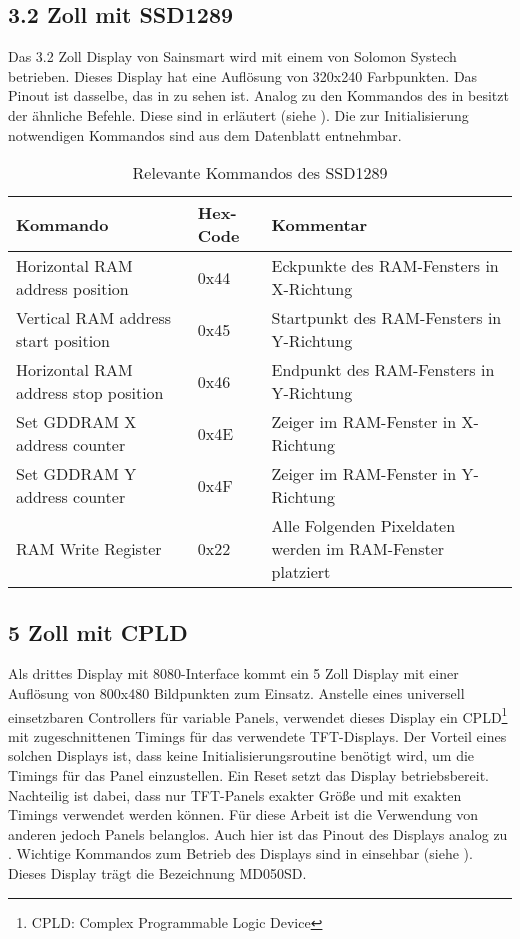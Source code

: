 \subsection{3.2 Zoll mit SSD1289}
Das 3.2 Zoll Display von Sainsmart wird mit einem  von Solomon Systech betrieben. Dieses Display hat eine Auflösung von 320x240 Farbpunkten. Das Pinout ist dasselbe, das in  zu sehen ist. Analog zu den Kommandos des  in  besitzt der  ähnliche Befehle. Diese sind in   erläutert (siehe \cite{SSD2007}). Die zur Initialisierung notwendigen Kommandos sind aus dem Datenblatt entnehmbar.
\begin{table}[h]
\begin{tabular}{|p{4cm}|p{1cm}|p{8cm}|}\hline
\rowcolor{TableBackgroundColor}
   \textbf{Kommando} & \textbf{Hex-Code} & \textbf{Kommentar}\\ \hline
   Horizontal RAM address position & 0x44 & Eckpunkte des RAM-Fensters in X-Richtung \\ \hline
   Vertical RAM address start position & 0x45 & Startpunkt des RAM-Fensters in Y-Richtung \\ \hline
   Horizontal RAM address stop position & 0x46 & Endpunkt des  RAM-Fensters in Y-Richtung \\ \hline
   Set GDDRAM X address counter & 0x4E & Zeiger im  RAM-Fenster in X-Richtung \\ \hline
   Set GDDRAM Y address counter & 0x4F & Zeiger im RAM-Fenster in Y-Richtung \\ \hline
   RAM Write  Register & 0x22 & Alle Folgenden Pixeldaten werden im RAM-Fenster platziert \\ \hline
\end{tabular}
\caption{Relevante Kommandos des SSD1289}
\label{tab:Kommandos_SSD1289}
\end{table}


\subsection{5 Zoll mit CPLD}
Als drittes Display mit 8080-Interface kommt ein 5 Zoll Display mit einer Auflösung von 800x480 Bildpunkten zum Einsatz. Anstelle eines universell einsetzbaren Controllers für variable Panels, verwendet dieses Display ein CPLD\footnote{CPLD: Complex Programmable Logic Device} mit zugeschnittenen Timings für das verwendete TFT-Displays. Der Vorteil eines solchen Displays ist, dass keine Initialisierungsroutine benötigt wird, um die Timings für das Panel einzustellen. Ein Reset setzt das Display betriebsbereit. Nachteilig ist dabei, dass nur TFT-Panels exakter Größe und mit exakten Timings verwendet werden können. Für diese Arbeit ist die Verwendung von anderen jedoch Panels belanglos. Auch hier ist das Pinout des Displays analog zu .\newline
Wichtige Kommandos zum Betrieb des Displays sind in  einsehbar (siehe \cite{ITEAD2013}). Dieses Display trägt die Bezeichnung MD050SD.

